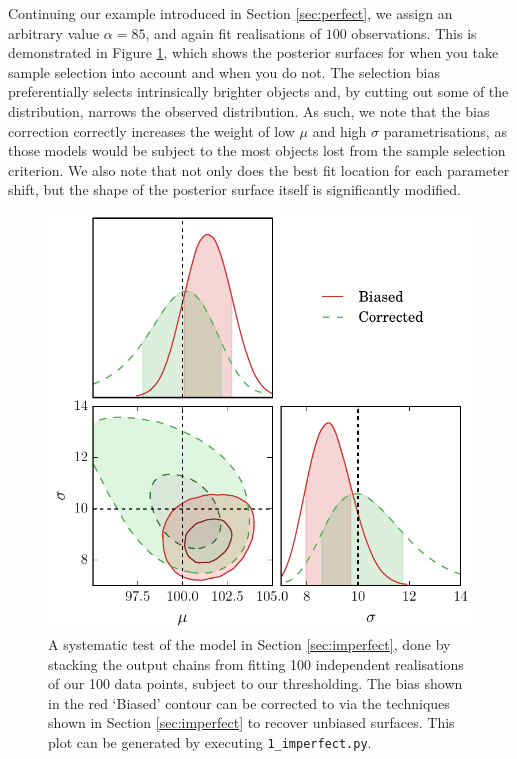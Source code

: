 \documentclass[a4paper,fleqn,usenatbib]{mnras}
\begin{document}
Continuing our example introduced in Section \ref{sec:perfect}, we assign an arbitrary value $\alpha=85$, and again fit realisations of $100$ observations.  This is demonstrated in Figure \ref{fig:imperfect}, which shows the posterior surfaces for when you take sample selection into account and when you do not. The selection bias preferentially selects intrinsically brighter objects and, by cutting out some of the distribution, narrows the observed distribution. As such, we note that the bias correction correctly increases the weight of low $\mu$ and high $\sigma$ parametrisations, as those models would be subject to the most objects lost from the sample selection criterion. We also note that not only does the best fit location for each parameter shift, but the shape of the posterior surface itself is significantly modified.
\begin{figure}
	\begin{center}
		\includegraphics[width=\columnwidth]{fig_1_imperfect.pdf}
	\end{center}
	\caption{A systematic test of the model in Section \ref{sec:imperfect}, done by stacking the output chains from fitting 100 independent realisations of our 100 data points, subject to our thresholding. The bias shown in the red `Biased' contour can be corrected to via the techniques shown in Section \ref{sec:imperfect} to recover unbiased surfaces. This plot can be generated by executing  \mbox{\texttt{1\_imperfect.py}}.}
	\label{fig:imperfect}
\end{figure}
\end{document}
